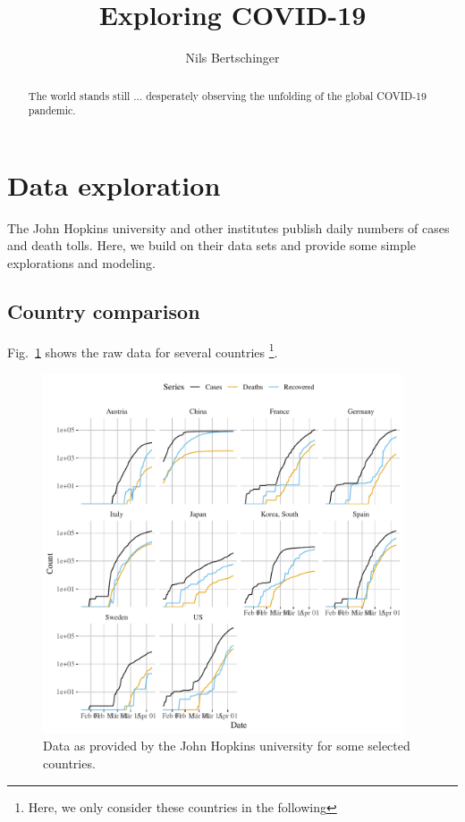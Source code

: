\documentclass[a4paper]{tufte-handout}
\title{Exploring COVID-19}
\author{Nils Bertschinger}
\newcommand{\fig}[1]{Fig.~\ref{fig:#1}}
\renewcommand*{\thefootnote}{\fnsymbol{footnote}}
\begin{document}
\maketitle%

\renewcommand*{\thefootnote}{\Roman{footnote}}

\begin{abstract}
  The world stands still ... desperately observing the unfolding of
  the global COVID-19 pandemic.
\end{abstract}

\section{Data exploration}

The John Hopkins university and other institutes publish daily numbers
of cases and death tolls. Here, we build on their data sets and
provide some simple explorations and modeling.

\subsection{Country comparison}

\fig{rawdata} shows the raw data for several countries \footnote{Here,
  we only consider these countries in the following}.

\begin{figure}
  \begin{center}
    \includegraphics[width=0.95\textwidth]{../figs/raw_data.pdf}
  \end{center}
  \caption{\label{fig:rawdata}Data as provided by the John Hopkins
    university for some selected countries.}
\end{figure}
\end{document}
